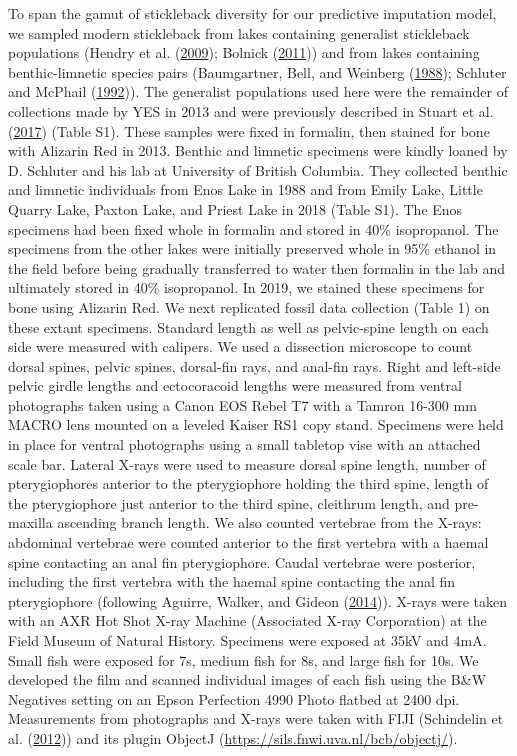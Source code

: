 \documentclass[
  12pt,
]{article}
\begin{document}
To span the gamut of stickleback diversity for our predictive imputation
model, we sampled modern stickleback from lakes containing generalist
stickleback populations (Hendry et al.
(\protect\hyperlink{ref-Hendryetal2009}{2009}); Bolnick
(\protect\hyperlink{ref-Bolnick2011}{2011})) and from lakes containing
benthic-limnetic species pairs (Baumgartner, Bell, and Weinberg
(\protect\hyperlink{ref-Baumgartneretal1988}{1988}); Schluter and
McPhail (\protect\hyperlink{ref-SchluterandMcPhail1992}{1992})). The
generalist populations used here were the remainder of collections made
by YES in 2013 and were previously described in Stuart et al.
(\protect\hyperlink{ref-Stuartetal2017}{2017}) (Table S1). These samples
were fixed in formalin, then stained for bone with Alizarin Red in 2013.
Benthic and limnetic specimens were kindly loaned by D. Schluter and his
lab at University of British Columbia. They collected benthic and
limnetic individuals from Enos Lake in 1988 and from Emily Lake, Little
Quarry Lake, Paxton Lake, and Priest Lake in 2018 (Table S1). The Enos
specimens had been fixed whole in formalin and stored in 40\%
isopropanol. The specimens from the other lakes were initially preserved
whole in 95\% ethanol in the field before being gradually transferred to
water then formalin in the lab and ultimately stored in 40\%
isopropanol. In 2019, we stained these specimens for bone using Alizarin
Red. We next replicated fossil data collection (Table 1) on these extant
specimens. Standard length as well as pelvic-spine length on each side
were measured with calipers. We used a dissection microscope to count
dorsal spines, pelvic spines, dorsal-fin rays, and anal-fin rays. Right
and left-side pelvic girdle lengths and ectocoracoid lengths were
measured from ventral photographs taken using a Canon EOS Rebel T7 with
a Tamron 16-300 mm MACRO lens mounted on a leveled Kaiser RS1 copy
stand. Specimens were held in place for ventral photographs using a
small tabletop vise with an attached scale bar. Lateral X-rays were used
to measure dorsal spine length, number of pterygiophores anterior to the
pterygiophore holding the third spine, length of the pterygiophore just
anterior to the third spine, cleithrum length, and pre-maxilla ascending
branch length. We also counted vertebrae from the X-rays: abdominal
vertebrae were counted anterior to the first vertebra with a haemal
spine contacting an anal fin pterygiophore. Caudal vertebrae were
posterior, including the first vertebra with the haemal spine contacting
the anal fin pterygiophore (following Aguirre, Walker, and Gideon
(\protect\hyperlink{ref-Aguirreetal2014}{2014})). X-rays were taken with
an AXR Hot Shot X-ray Machine (Associated X-ray Corporation) at the
Field Museum of Natural History. Specimens were exposed at 35kV and 4mA.
Small fish were exposed for 7s, medium fish for 8s, and large fish for
10s. We developed the film and scanned individual images of each fish
using the B\&W Negatives setting on an Epson Perfection 4990 Photo
flatbed at 2400 dpi. Measurements from photographs and X-rays were taken
with FIJI (Schindelin et al.
(\protect\hyperlink{ref-Schindelinetal2012}{2012})) and its plugin
ObjectJ (\url{https://sils.fnwi.uva.nl/bcb/objectj/}).
\end{document}
